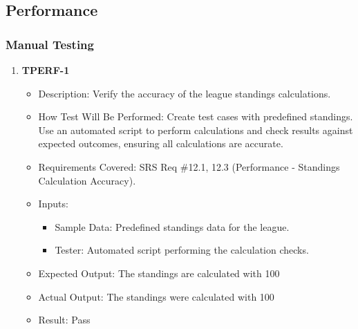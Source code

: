 \documentclass[12pt, titlepage]{article}
\begin{document}
\subsection{Performance}

\subsubsection{Manual Testing}
\begin{enumerate}
    \item \textbf{TPERF-1}  
        \begin{itemize}
            \item Description: Verify the accuracy of the league standings calculations.
            \item How Test Will Be Performed: Create test cases with predefined standings. Use an automated script to perform calculations and check results against expected outcomes, ensuring all calculations are accurate.
            \item Requirements Covered: SRS Req \#12.1, 12.3 (Performance - Standings Calculation Accuracy).
            \item Inputs:  
                \begin{itemize}
                    \item Sample Data: Predefined standings data for the league.
                    \item Tester: Automated script performing the calculation checks.
                \end{itemize}
            \item Expected Output: The standings are calculated with 100%
            \item Actual Output: The standings were calculated with 100%
            \item Result: Pass
        \end{itemize}


\end{enumerate}
\end{document}
